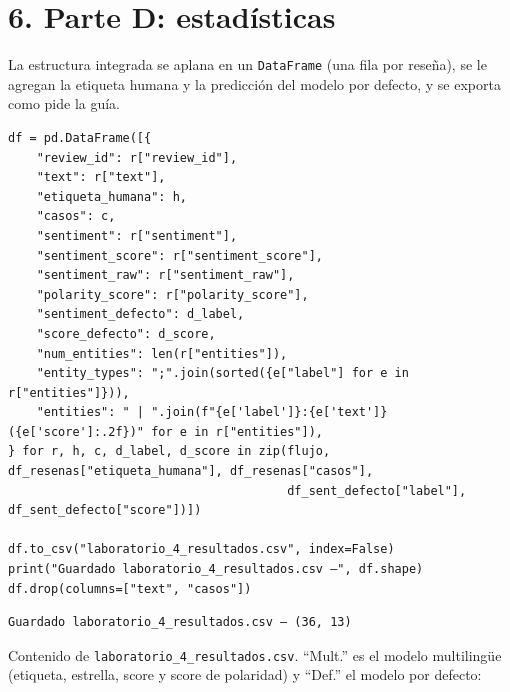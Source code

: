 \documentclass[12pt,a4paper]{article}
\begin{document}
\section{6. Parte D: estadísticas}

La estructura integrada se aplana en un \texttt{DataFrame} (una fila por reseña), se le agregan la
etiqueta humana y la predicción del modelo por defecto, y se exporta como pide la guía.

\begin{lstlisting}[style=codigo]
df = pd.DataFrame([{
    "review_id": r["review_id"],
    "text": r["text"],
    "etiqueta_humana": h,
    "casos": c,
    "sentiment": r["sentiment"],
    "sentiment_score": r["sentiment_score"],
    "sentiment_raw": r["sentiment_raw"],
    "polarity_score": r["polarity_score"],
    "sentiment_defecto": d_label,
    "score_defecto": d_score,
    "num_entities": len(r["entities"]),
    "entity_types": ";".join(sorted({e["label"] for e in r["entities"]})),
    "entities": " | ".join(f"{e['label']}:{e['text']} ({e['score']:.2f})" for e in r["entities"]),
} for r, h, c, d_label, d_score in zip(flujo, df_resenas["etiqueta_humana"], df_resenas["casos"],
                                       df_sent_defecto["label"], df_sent_defecto["score"])])

df.to_csv("laboratorio_4_resultados.csv", index=False)
print("Guardado laboratorio_4_resultados.csv —", df.shape)
df.drop(columns=["text", "casos"])
\end{lstlisting}

\begin{lstlisting}[style=salida]
Guardado laboratorio_4_resultados.csv — (36, 13)
\end{lstlisting}


Contenido de \texttt{laboratorio\_4\_resultados.csv}. ``Mult.'' es el modelo multilingüe
(etiqueta, estrella, score y score de polaridad) y ``Def.'' el modelo por defecto:
\end{document}
